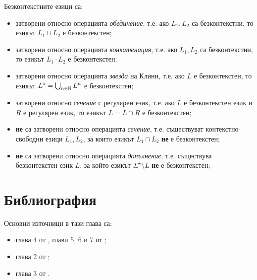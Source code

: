 Безконтекстните езици са:
\begin{itemize}
\item 
  затворени относно операцията {\em обединение}, т.е.
  ако $L_1, L_2$ са безконтекстни, то езикът $L_1 \cup L_2$ е безконтекстен; 
\item
  затворени относно операцията {\em конкатенация}, т.е.
  ако $L_1, L_2$ са безконтекстни, то езикът $L_1 \cdot L_2$ е безконтекстен; 
\item
  затворени относно операцията {\em звезда} на Клини, т.е.
  ако $L$ е безконтекстен, то езикът $L^\star = \bigcup_{n\in\mathbb{N}} L^n$ е безконтекстен; 
\item
  затворени относно {\em сечение} с регулярен език, т.е.
  ако $L$ е безконтекстен език и $R$ е регулярен език, то езикът $L = L \cap R$ е безконтекстен; 
\item
  {\bf не} са затворени относно операцията {\em сечение}, т.е.
  съществуват контекстно-свободни езици $L_1, L_2$, за които езикът $L_1 \cap L_2$ {\bf не} е безконтекстен; 
\item
  {\bf не} са затворени относно операцията {\em допълнение}, т.е.
  съществува безконтекстен език $L$, за който езикът $\Sigma^\star\setminus L$ {\bf не} е безконтекстен; 
\end{itemize}

\section*{Библиография}

Основни източници в тази глава са:
\begin{itemize}
\item 
  глава 4 от \cite{hopcroft1}, глави 5, 6 и 7 от \cite{hopcroft2};
\item
  глава 2 от \cite{sipser1};
\item
  глава 3 от \cite{papadimitriou}.
\end{itemize}



